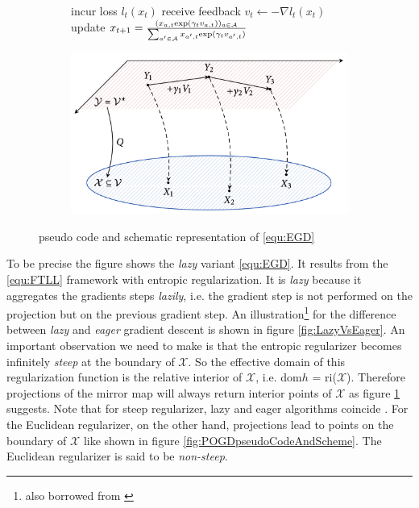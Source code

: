 \begin{figure}[H]
\centering
\begin{subfigure}{.5\textwidth}
    \begin{algorithm}[H]
    \DontPrintSemicolon
     {
    incur loss $l_t(x_t)$ \;
    receive feedback $v_t \gets -\nabla l_t(x_t)$ \;
    update $x_{t+1} = \frac{(x_{a,t}\textnormal{exp}(\gamma_t v_{a,t}))_{a\in\mathcal{A}}}{\sum_{a'\in\mathcal{A}}x_{a',t}\textnormal{exp}(\gamma_t v_{a',t})}$ \;
    }
    \end{algorithm}
\end{subfigure}%
\begin{subfigure}{.5\textwidth}
  \centering
  \includegraphics[width=\textwidth]{logos/EGDscheme.png}
\end{subfigure}
\caption{pseudo code and schematic representation of \ref{equ:EGD}}
\label{fig:EGDpseudoCodeAndScheme}
\end{figure}

To be precise the figure shows the \textit{lazy} variant \ref{equ:EGD}. It results from the \ref{equ:FTLL} framework with entropic regularization. It is \textit{lazy} because it aggregates the gradients steps \textit{lazily}, i.e. the gradient step is not performed on the projection but on the previous gradient step. An illustration\footnote{also borrowed from \cite[Chapter 2]{HDRmertikopoulos}} for the difference between \textit{lazy} and \textit{eager} gradient descent is shown in figure \ref{fig:LazyVsEager}. An important observation we need to make is that the entropic regularizer becomes infinitely \textit{steep} at the boundary of $\mathcal{X}$. So the effective domain of this regularization function is the relative interior of $\mathcal{X}$, i.e. dom$h$ = ri($\mathcal{X}$). Therefore projections of the mirror map will always return interior points of $\mathcal{X}$ as figure \ref{fig:EGDpseudoCodeAndScheme} suggests. Note that for steep regularizer, lazy and eager algorithms coincide \cite{HDRmertikopoulos}. For the Euclidean regularizer, on the other hand, projections lead to points on the boundary of $\mathcal{X}$ like shown in figure \ref{fig:POGDpseudoCodeAndScheme}. The Euclidean regularizer is said to be \textit{non-steep}. \\

